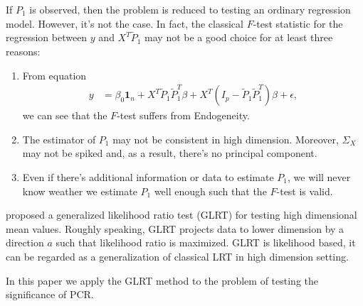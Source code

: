 \documentclass[review]{elsarticle}
\theoremstyle{plain}
\theoremstyle{definition}
\theoremstyle{remark}
\begin{document}
If $P_1$ is observed, then the problem is reduced to testing an ordinary regression model. However, it's not the case. In fact, the classical $F$-test statistic for the regression between $y$  and  $X^T \tilde{P}_1$ may not be a good choice for at least three reasons:
\begin{enumerate}
    \item
From equation
\begin{equation}
    \begin{aligned}
        y&=\beta_0 \textbf{1}_n+X^T \tilde{P}_1\tilde{P}_1^T\beta+X^T (I_p -\tilde{P}_1 \tilde{P}_1^T)\beta+\epsilon,
    \end{aligned}
\end{equation}
we can see that the $F$-test suffers from Endogeneity.
\item
The estimator of $P_1$ may not be consistent in high dimension. Moreover, $\Sigma_X$ may not be spiked and, as a result, there's no principal component.
\item
Even if there's additional information or data to estimate $P_1$, we will never know weather we estimate $P_1$ well enough such that the $F$-test is valid.%
\end{enumerate}



\cite{Zhao2016A} proposed a generalized likelihood ratio test (GLRT) for testing high dimensional mean values.
Roughly speaking, GLRT projects data to lower dimension by a direction $a$ such that likelihood ratio is maximized. GLRT is likelihood based, it can be regarded as a generalization of classical LRT in high dimension setting.

In this paper we apply the GLRT method to the problem of testing the significance of PCR.
\end{document}
